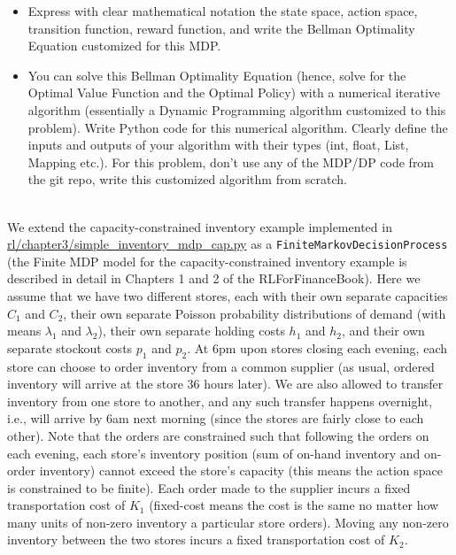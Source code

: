 \documentclass[12pt]{exam}
\begin{document}
\begin{questions}
\begin{itemize}
	\item Express with clear mathematical notation the state space, action space, transition function, reward function, and write the Bellman Optimality Equation customized for this MDP.
	\item You can solve this Bellman Optimality Equation (hence, solve for the Optimal Value Function and the Optimal Policy) with a numerical iterative algorithm (essentially a Dynamic Programming algorithm customized to this problem). Write Python code for this numerical algorithm. Clearly define the inputs and outputs of your algorithm with their types (int, float, List, Mapping etc.). For this problem, don't use any of the MDP/DP code from the git repo, write this customized algorithm from scratch.
\end{itemize}

 \\ We extend the capacity-constrained inventory example implemented in \\ \href{https://github.com/TikhonJelvis/RL-book/blob/master/rl/chapter3/simple_inventory_mdp_cap.py}{rl\//chapter3\//simple\_inventory\_mdp\_cap.py} as a \lstinline{FiniteMarkovDecisionProcess} (the Finite MDP model for the capacity-constrained inventory example is described in detail in Chapters 1 and 2 of the RLForFinanceBook). Here we assume that we have two different stores, each with their own separate capacities $C_1$ and $C_2$, their own separate Poisson probability distributions of demand (with means $\lambda_1$ and $\lambda_2$), their own separate holding costs $h_1$ and $h_2$, and their own separate stockout costs $p_1$ and $p_2$. At 6pm upon stores closing each evening, each store can choose to order inventory from a common supplier (as usual, ordered inventory will arrive at the store 36 hours later). We are also allowed to transfer inventory from one store to another, and any such transfer happens overnight, i.e., will arrive by 6am next morning (since the stores are fairly close to each other). Note that the orders are constrained such that following the orders on each evening, each store's inventory position (sum of on-hand inventory and on-order inventory) cannot exceed the store's capacity (this means the action space is constrained to be finite). Each order made to the supplier incurs a fixed transportation cost of $K_1$ (fixed-cost means the cost is the same no matter how many units of non-zero inventory a particular store orders). Moving any non-zero inventory between the two stores incurs a fixed transportation cost of $K_2$. 


\end{questions}
\end{document}
